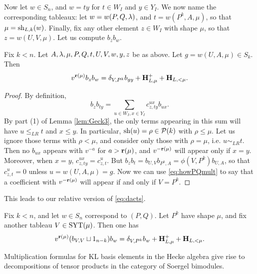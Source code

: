 Now let $w \in S_n$, and $w = ty$ for $t \in W_I$ and $y \in Y_I$. We now name the corresponding tableaux: let $w = w(P,Q,\lambda)$, and $t = w(P^k,A,\mu)$, so that $\mu = \operatorname{sh}_{L,k}(w)$. Finally, fix any other element $z \in W_I$ with shape $\mu$, so that $z = w(U,V,\mu)$. Let us compute $b_z b_w$.

\begin{prop} \label{prop:relaction} Fix $k < n$. Let $A, \lambda, \mu, P, Q, t, U, V, w, y, z$ be as above. Let $g = w(U,A,\mu) \in S_k$. Then
\begin{equation} v^{\mathbf{r}(\mu)} b_z b_w = \delta_{V,P^k} b_{gy} + {\mathbf H}^+_{L,\mu} + {\mathbf H}_{L,< \mu}.\end{equation}
\end{prop}

\begin{proof} By definition,
\begin{equation} b_z b_{ty} = \sum_{u \in W_I, x \in Y_I} c_{z,ty}^{ux} b_{ux}. \end{equation}
By part (1) of Lemma \ref{lem:Geck3}, the only terms appearing in this sum will have $u \le_{LR} t$ and $x \le y$. In particular, $\operatorname{sh}(u) = \rho \in {\mathcal{P}}(k)$ with $\rho \le \mu$. Let us ignore those terms with $\rho < \mu$, and consider only those with $\rho = \mu$, i.e. $u \sim_{LR} t$.  Then no $b_{ux}$ appears with $v^{-a}$ for $a > \mathbf{r}(\mu)$, and $v^{-\mathbf{r}(\mu)}$ will appear only if $x = y$. Moreover, when $x = y$, $c_{z,ty}^{ux} = c_{z,t}^{u}$. But $b_z b_t = b_{U,V} b_{P^k,A} = \phi(V,P^k) b_{U,A}$, so that $c_{z,t}^{u} = 0$ unless $u = w(U,A,\mu) = g$. Now we can use \eqref{eq:howPQmult} to say that a coefficient with $v^{-\mathbf{r}(\mu)}$ will appear if and only if $V = P^k$.
\end{proof}

This leads to our relative version of \eqref{eq:dacts}.

\begin{cor} \label{cor:relactioninvolution} Fix $k < n$, and let $w \in S_n$ correspond to $(P,Q)$. Let $P^k$ have shape $\mu$, and fix another tableau $V \in \operatorname{SYT}(\mu)$. Then one has
\begin{equation} \label{eq:dactsrel} v^{\mathbf{r}(\mu)} (b_{V,V} \sqcup 1_{n-k}) b_w = \delta_{V,P^k} b_w + {\mathbf H}^+_{L,\mu} + {\mathbf H}_{L,< \mu}. \end{equation} \end{cor}
	
Multiplication formulas for KL basis elements in the Hecke algebra give rise to decompositions of tensor products in the category of Soergel bimodules.

